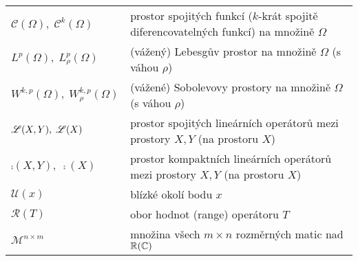 
\begin{table}[h!]
\begin{tabular}{l|l}
$\mathcal{C}(\Omega), \; \mathcal{C}^k(\Omega)$
& prostor spojitých funkcí ($k$-krát spojitě diferencovatelných funkcí) na množině $\Omega$
\\
$L^p(\Omega), \; L^p_\rho(\Omega)$
& (vážený) Lebesgův prostor na množině $\Omega$ (s váhou $\rho$)
\\
$W^{k,p}(\Omega), \; W^{k,p}_\rho(\Omega)$
& (vážené) Sobolevovy prostory na množině $\Omega$ (s váhou $\rho$)
\\
$\mathscr{L}(X, Y), \; \mathscr{L}(X)$
& prostor spojitých lineárních operátorů mezi prostory $X, Y$ (na prostoru $X$)
\\
$\comp(X, Y), \; \comp(X)$
& prostor kompaktních lineárních operátorů mezi prostory $X, Y$ (na prostoru $X$)\\
$\mathcal{U}(x)$ & blízké okolí bodu $x$\\
$\mathcal{R}(T)$ & obor hodnot (range) operátoru $T$\\
$\mathcal{M}^{n\times m}$ & množina všech $m\times n$ rozměrných matic nad $\mathbb{R}(\mathbb{C})$
\end{tabular}
\end{table}